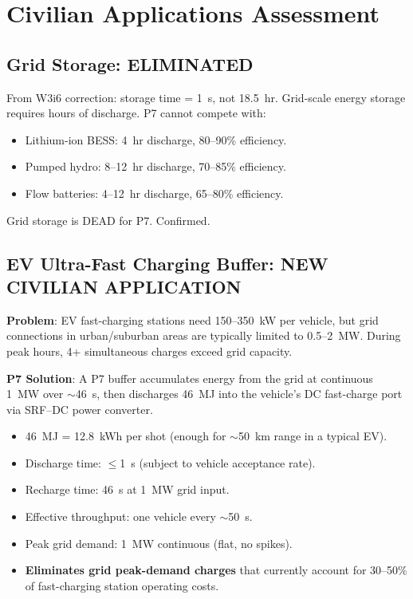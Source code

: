 \documentclass[11pt]{article}
\begin{document}
\section{Civilian Applications Assessment}\label{sec:civilian}

\subsection{Grid Storage: ELIMINATED}

From W3i6 correction: storage time = 1~s, not 18.5~hr. Grid-scale
energy storage requires hours of discharge. P7 cannot compete with:
\begin{itemize}
\item Lithium-ion BESS: 4~hr discharge, 80--90\% efficiency.
\item Pumped hydro: 8--12~hr discharge, 70--85\% efficiency.
\item Flow batteries: 4--12~hr discharge, 65--80\% efficiency.
\end{itemize}
Grid storage is DEAD for P7. Confirmed.

\subsection{EV Ultra-Fast Charging Buffer: NEW CIVILIAN APPLICATION}

\begin{tcolorbox}[colback=blue!5!white, colframe=blue!70!black,
  title=\textbf{NEW: EV Fast-Charge Buffer Station}]

\textbf{Problem}: EV fast-charging stations need 150--350~kW per
vehicle, but grid connections in urban/suburban areas are typically
limited to 0.5--2~MW. During peak hours, 4+ simultaneous charges
exceed grid capacity.

\textbf{P7 Solution}: A P7 buffer accumulates energy from the grid
at continuous 1~MW over $\sim$46~s, then discharges 46~MJ into the
vehicle's DC fast-charge port via SRF--DC power converter.

\begin{itemize}
\item 46~MJ = 12.8~kWh per shot (enough for $\sim$50~km range in
  a typical EV).
\item Discharge time: $\leq$1~s (subject to vehicle acceptance rate).
\item Recharge time: 46~s at 1~MW grid input.
\item Effective throughput: one vehicle every $\sim$50~s.
\item Peak grid demand: 1~MW continuous (flat, no spikes).
\item \textbf{Eliminates grid peak-demand charges} that currently
  account for 30--50\% of fast-charging station operating costs.
\end{itemize}
\end{tcolorbox}
\end{document}
